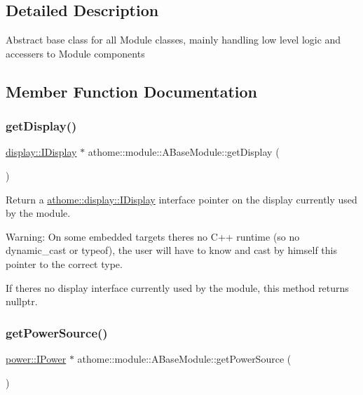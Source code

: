 \subsection{Detailed Description}
Abstract base class for all Module classes, mainly handling low level logic and accessers to Module components 

\subsection{Member Function Documentation}
\mbox{\label{classathome_1_1module_1_1_a_base_module_ada20b6ad1e6f750d2886f1e7b10cca70}} 
\subsubsection{\texorpdfstring{get\+Display()}{getDisplay()}}
{\footnotesize\ttfamily \mbox{\hyperlink{classathome_1_1display_1_1_i_display}{display\+::\+I\+Display}} $\ast$ athome\+::module\+::\+A\+Base\+Module\+::get\+Display (\begin{DoxyParamCaption}{ }\end{DoxyParamCaption})}

Return a \mbox{\hyperlink{classathome_1_1display_1_1_i_display}{athome\+::display\+::\+I\+Display}} interface pointer on the display currently used by the module.

Warning\+: On some embedded targets there\textquotesingle{}s no C++ runtime (so no {\ttfamily dynamic\+\_\+cast} or {\ttfamily typeof}), the user will have to know and cast by himself this pointer to the correct type.

If there\textquotesingle{}s no display interface currently used by the module, this method returns {\ttfamily nullptr}. \mbox{\label{classathome_1_1module_1_1_a_base_module_a3152f721f953e32a1f965856936d188e}} 
\subsubsection{\texorpdfstring{get\+Power\+Source()}{getPowerSource()}}
{\footnotesize\ttfamily \mbox{\hyperlink{classathome_1_1power_1_1_i_power}{power\+::\+I\+Power}} $\ast$ athome\+::module\+::\+A\+Base\+Module\+::get\+Power\+Source (\begin{DoxyParamCaption}{ }\end{DoxyParamCaption})}

